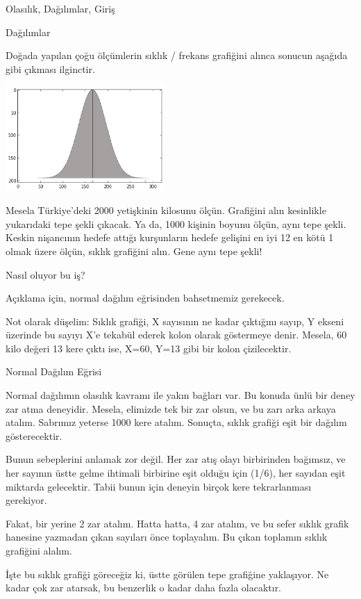 \documentclass[12pt,fleqn]{article}\usepackage{../../common}
\begin{document}
Olasılık, Dağılımlar, Giriş

Dağılımlar

Doğada yapılan çoğu ölçümlerin sıklık / frekans grafiğini alınca sonucun
aşağıda gibi çıkması ilginctir.

\includegraphics[height=4cm]{stat_intro_01.png}

Mesela Türkiye'deki 2000 yetişkinin kilosunu ölçün. Grafiğini alın
kesinlikle yukarıdaki tepe şekli çıkacak. Ya da, 1000 kişinin boyunu ölçün,
aynı tepe şekli. Keskin nişancının hedefe attığı kurşunların hedefe
gelişini en iyi 12 en kötü 1 olmak üzere ölçün, sıklık grafiğini alın. Gene
aynı tepe şekli!

Nasıl oluyor bu iş?

Açıklama için, normal dağılım eğrisinden bahsetmemiz gerekecek.

Not olarak düşelim: Sıklık grafiği, X sayısının ne kadar çıktığını sayıp, Y
ekseni üzerinde bu sayıyı X'e tekabül ederek kolon olarak göstermeye
denir. Mesela, 60 kilo değeri 13 kere çıktı ise, X=60, Y=13 gibi bir kolon
çizilecektir.

Normal Dağılım Eğrisi

Normal dağılımın olasılık kavramı ile yakın bağları var. Bu konuda ünlü bir
deney zar atma deneyidir. Mesela, elimizde tek bir zar olsun, ve bu zarı
arka arkaya atalım. Sabrımız yeterse 1000 kere atalım. Sonuçta, sıklık
grafiği eşit bir dağılım gösterecektir.

Bunun sebeplerini anlamak zor değil. Her zar atış olayı birbirinden
bağımsız, ve her sayının üstte gelme ihtimali birbirine eşit olduğu için
(1/6), her sayıdan eşit miktarda gelecektir. Tabii bunun için deneyin
birçok kere tekrarlanması gerekiyor.

Fakat, bir yerine 2 zar atalım. Hatta hatta, 4 zar atalım, ve bu sefer
sıklık grafik hanesine yazmadan çıkan sayıları önce toplayalım. Bu çıkan
toplamın sıklık grafiğini alalım.

İşte bu sıklık grafiği göreceğiz ki, üstte görülen tepe grafiğine yaklaşıyor. Ne
kadar çok zar atarsak, bu benzerlik o kadar daha fazla olacaktır.
\end{document}

